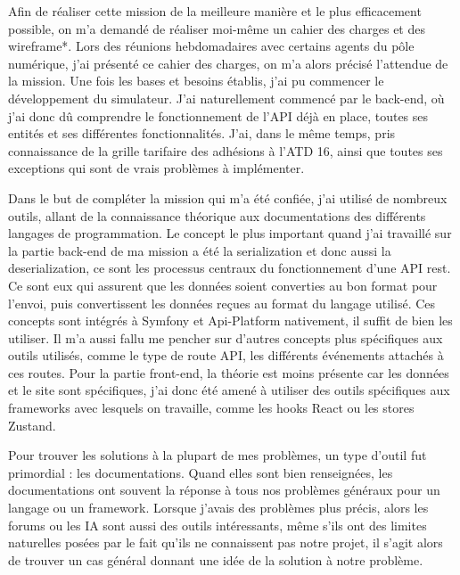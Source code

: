 \documentclass[a4paper,12pt]{report}
\begin{document}
\vspace{1em}

Afin de réaliser cette mission de la meilleure manière et le plus efficacement possible, on m'a demandé de réaliser moi-même un cahier des charges et des wireframe*. Lors des réunions hebdomadaires avec certains agents du pôle numérique, j'ai présenté ce cahier des charges, on m'a alors précisé l'attendue de la mission. Une fois les bases et besoins établis, j'ai pu commencer le développement du simulateur. J'ai naturellement commencé par le back-end, où j'ai donc dû comprendre le fonctionnement de l'API déjà en place, toutes ses entités et ses différentes fonctionnalités. J'ai, dans le même temps, pris connaissance de la grille tarifaire des adhésions à l'ATD 16, ainsi que toutes ses exceptions qui sont de vrais problèmes à implémenter.

\vspace{1em}

Dans le but de compléter la mission qui m'a été confiée, j'ai utilisé de nombreux outils, allant de la connaissance théorique aux documentations des différents langages de programmation. Le concept le plus important quand j'ai travaillé sur la partie back-end de ma mission a été la serialization et donc aussi la deserialization, ce sont les processus centraux du fonctionnement d'une API rest. Ce sont eux qui assurent que les données soient converties au bon format pour l'envoi, puis convertissent les données reçues au format du langage utilisé. Ces concepts sont intégrés à Symfony et Api-Platform nativement, il suffit de bien les utiliser. Il m'a aussi fallu me pencher sur d'autres concepts plus spécifiques aux outils utilisés, comme le type de route API, les différents événements attachés à ces routes. Pour la partie front-end, la théorie est moins présente car les données et le site sont spécifiques, j'ai donc été amené à utiliser des outils spécifiques aux frameworks avec lesquels on travaille, comme les hooks React ou les stores Zustand.

\vspace{1em}

Pour trouver les solutions à la plupart de mes problèmes, un type d'outil fut primordial : les documentations. Quand elles sont bien renseignées, les documentations ont souvent la réponse à tous nos problèmes généraux pour un langage ou un framework. Lorsque j'avais des problèmes plus précis, alors les forums ou les IA sont aussi des outils intéressants, même s'ils ont des limites naturelles posées par le fait qu'ils ne connaissent pas notre projet, il s'agit alors de trouver un cas général donnant une idée de la solution à notre problème.
\end{document}
